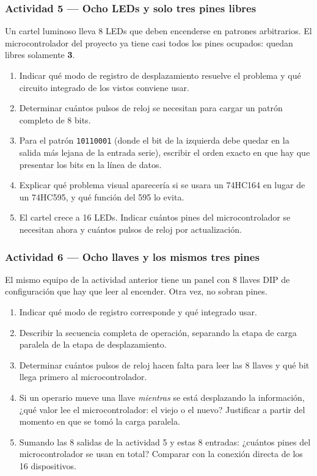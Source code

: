\subsubsection*{Actividad 5 --- Ocho LEDs y solo tres pines libres}

Un cartel luminoso lleva 8 LEDs que deben encenderse en patrones arbitrarios. El microcontrolador del proyecto ya tiene casi todos los pines ocupados: quedan libres solamente \textbf{3}.

\begin{enumerate}[label=\alph*)]
    \item Indicar qué modo de registro de desplazamiento resuelve el problema y qué circuito integrado de los vistos conviene usar.
    \item Determinar cuántos pulsos de reloj se necesitan para cargar un patrón completo de 8 bits.
    \item Para el patrón \texttt{10110001} (donde el bit de la izquierda debe quedar en la salida más lejana de la entrada serie), escribir el orden exacto en que hay que presentar los bits en la línea de datos.
    \item Explicar qué problema visual aparecería si se usara un 74HC164 en lugar de un 74HC595, y qué función del 595 lo evita.
    \item El cartel crece a 16 LEDs. Indicar cuántos pines del microcontrolador se necesitan ahora y cuántos pulsos de reloj por actualización.
\end{enumerate}

\subsubsection*{Actividad 6 --- Ocho llaves y los mismos tres pines}

El mismo equipo de la actividad anterior tiene un panel con 8 llaves DIP de configuración que hay que leer al encender. Otra vez, no sobran pines.

\begin{enumerate}[label=\alph*)]
    \item Indicar qué modo de registro corresponde y qué integrado usar.
    \item Describir la secuencia completa de operación, separando la etapa de carga paralela de la etapa de desplazamiento.
    \item Determinar cuántos pulsos de reloj hacen falta para leer las 8 llaves y qué bit llega primero al microcontrolador.
    \item Si un operario mueve una llave \textit{mientras} se está desplazando la información, ¿qué valor lee el microcontrolador: el viejo o el nuevo? Justificar a partir del momento en que se tomó la carga paralela.
    \item Sumando las 8 salidas de la actividad 5 y estas 8 entradas: ¿cuántos pines del microcontrolador se usan en total? Comparar con la conexión directa de los 16 dispositivos.
\end{enumerate}


